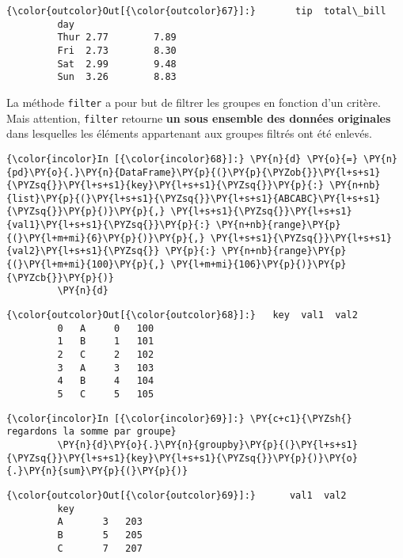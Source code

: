 \begin{Verbatim}[commandchars=\\\{\}]
{\color{outcolor}Out[{\color{outcolor}67}]:}       tip  total\_bill
         day                  
         Thur 2.77        7.89
         Fri  2.73        8.30
         Sat  2.99        9.48
         Sun  3.26        8.83
\end{Verbatim}
            
    La méthode \texttt{filter} a pour but de filtrer les groupes en fonction
d'un critère. Mais attention, \texttt{filter} retourne \textbf{un sous
ensemble des données originales} dans lesquelles les éléments
appartenant aux groupes filtrés ont été enlevés.

    \begin{Verbatim}[commandchars=\\\{\}]
{\color{incolor}In [{\color{incolor}68}]:} \PY{n}{d} \PY{o}{=} \PY{n}{pd}\PY{o}{.}\PY{n}{DataFrame}\PY{p}{(}\PY{p}{\PYZob{}}\PY{l+s+s1}{\PYZsq{}}\PY{l+s+s1}{key}\PY{l+s+s1}{\PYZsq{}}\PY{p}{:} \PY{n+nb}{list}\PY{p}{(}\PY{l+s+s1}{\PYZsq{}}\PY{l+s+s1}{ABCABC}\PY{l+s+s1}{\PYZsq{}}\PY{p}{)}\PY{p}{,} \PY{l+s+s1}{\PYZsq{}}\PY{l+s+s1}{val1}\PY{l+s+s1}{\PYZsq{}}\PY{p}{:} \PY{n+nb}{range}\PY{p}{(}\PY{l+m+mi}{6}\PY{p}{)}\PY{p}{,} \PY{l+s+s1}{\PYZsq{}}\PY{l+s+s1}{val2}\PY{l+s+s1}{\PYZsq{}} \PY{p}{:} \PY{n+nb}{range}\PY{p}{(}\PY{l+m+mi}{100}\PY{p}{,} \PY{l+m+mi}{106}\PY{p}{)}\PY{p}{\PYZcb{}}\PY{p}{)}
         \PY{n}{d}
\end{Verbatim}


\begin{Verbatim}[commandchars=\\\{\}]
{\color{outcolor}Out[{\color{outcolor}68}]:}   key  val1  val2
         0   A     0   100
         1   B     1   101
         2   C     2   102
         3   A     3   103
         4   B     4   104
         5   C     5   105
\end{Verbatim}
            
    \begin{Verbatim}[commandchars=\\\{\}]
{\color{incolor}In [{\color{incolor}69}]:} \PY{c+c1}{\PYZsh{} regardons la somme par groupe}
         \PY{n}{d}\PY{o}{.}\PY{n}{groupby}\PY{p}{(}\PY{l+s+s1}{\PYZsq{}}\PY{l+s+s1}{key}\PY{l+s+s1}{\PYZsq{}}\PY{p}{)}\PY{o}{.}\PY{n}{sum}\PY{p}{(}\PY{p}{)}
\end{Verbatim}


\begin{Verbatim}[commandchars=\\\{\}]
{\color{outcolor}Out[{\color{outcolor}69}]:}      val1  val2
         key            
         A       3   203
         B       5   205
         C       7   207
\end{Verbatim}
            

